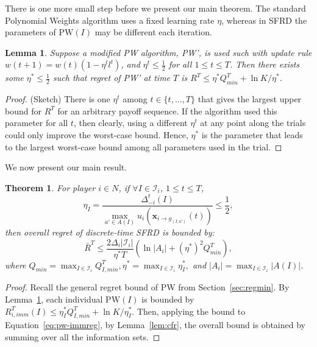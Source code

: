 \documentclass{aamas2014}
\newcommand{\bx}{\mathbf{x}}
\newcommand{\cI}{\mathcal{I}}
\newcommand{\PW}{\mbox{PW}}
\newtheorem{theorem}{Theorem}
\newtheorem{lemma}{Lemma}
\begin{document}
There is one more small step before we present our main theorem. The standard Polynomial Weights algorithm uses a fixed 
learning rate $\eta$, whereas in SFRD the parameters of $\PW(I)$ may be different each iteration. 

\begin{lemma}
\label{lem:diffrates}
Suppose a modified PW algorithm, PW', is used such with update rule $w(t+1) = w(t)(1 - \eta^t l^t)$, and 
$\eta^t \le \frac{1}{2}$ for all $1 \le t \le T$. Then there exists some $\eta^* \le \frac{1}{2}$ such that regret of PW' 
at time $T$ is $R^T \le \eta^* Q^T_{min} + \ln K / {\eta^*}$.
\end{lemma}
\begin{proof}(Sketch)
There is one $\eta^t$ among $t \in \{ t, \ldots, T \}$ that gives the largest upper bound for $R^T$ for an arbitrary 
payoff sequence. If the algorithm used this parameter for all $t$, then clearly, using a different $\eta^t$ at any point 
along the trials could only improve the worst-case bound. Hence, $\eta^*$ is the parameter that leads to the largest 
worst-case bound among all parameters used in the trial. 
\end{proof}

\noindent We now present our main result. %



\begin{theorem}
\label{thm:main}
For player $i \in N$, if $\forall I \in \cI_i$, $1 \le t \le T$,
\[ 
\eta_I = \frac{\Delta^t_{-i}(I)}{\max_{a' \in A(I)} u_i(\bx_{i \rightarrow g_{(I,a')}}(t))} \le \frac{1}{2}, 
\]
then overall regret of discrete-time SFRD is bounded by: 
\[
\bar{R}^T \le \frac{2 \Delta_i |\cI_i|}{\eta^* T} \left( \ln{|A_i|} + (\eta^*)^2 Q^T_{min}  \right), 
\]
where $Q_{min} = \max_{I \in \cI_i} Q^T_{I,min}, \eta^* = \max_{I \in \cI_i} \eta_I^*,$ and $|A_i| = \max_{I \in \cI_i}|A(I)|$. 
\end{theorem}
\begin{proof}
Recall the general regret bound of PW from Section~\ref{sec:regmin}. By Lemma~\ref{lem:diffrates}, each individual $\PW(I)$ is 
bounded by $R^T_{i,imm}(I) \le \eta^*_I Q^T_{I,min} + \ln K / \eta^*_I$. Then, applying the bound to Equation~\ref{eq:pw-immreg}, by Lemma~\ref{lem:cfr}, the overall bound is obtained by summing over all the information sets. 
\end{proof}
\end{document}
